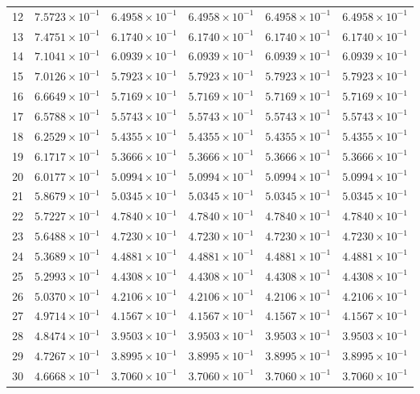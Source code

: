 \begin{table}[H]
\begin{tabular}{@{}rrrrrr@{}}
12 & $7.5723\times10^{-1}$ & $6.4958\times10^{-1}$ & $6.4958\times10^{-1}$ & $6.4958\times10^{-1}$ & $6.4958\times10^{-1}$\\
13 & $7.4751\times10^{-1}$ & $6.1740\times10^{-1}$ & $6.1740\times10^{-1}$ & $6.1740\times10^{-1}$ & $6.1740\times10^{-1}$\\
14 & $7.1041\times10^{-1}$ & $6.0939\times10^{-1}$ & $6.0939\times10^{-1}$ & $6.0939\times10^{-1}$ & $6.0939\times10^{-1}$\\
15 & $7.0126\times10^{-1}$ & $5.7923\times10^{-1}$ & $5.7923\times10^{-1}$ & $5.7923\times10^{-1}$ & $5.7923\times10^{-1}$\\
16 & $6.6649\times10^{-1}$ & $5.7169\times10^{-1}$ & $5.7169\times10^{-1}$ & $5.7169\times10^{-1}$ & $5.7169\times10^{-1}$\\
17 & $6.5788\times10^{-1}$ & $5.5743\times10^{-1}$ & $5.5743\times10^{-1}$ & $5.5743\times10^{-1}$ & $5.5743\times10^{-1}$\\
18 & $6.2529\times10^{-1}$ & $5.4355\times10^{-1}$ & $5.4355\times10^{-1}$ & $5.4355\times10^{-1}$ & $5.4355\times10^{-1}$\\
19 & $6.1717\times10^{-1}$ & $5.3666\times10^{-1}$ & $5.3666\times10^{-1}$ & $5.3666\times10^{-1}$ & $5.3666\times10^{-1}$\\
20 & $6.0177\times10^{-1}$ & $5.0994\times10^{-1}$ & $5.0994\times10^{-1}$ & $5.0994\times10^{-1}$ & $5.0994\times10^{-1}$\\
21 & $5.8679\times10^{-1}$ & $5.0345\times10^{-1}$ & $5.0345\times10^{-1}$ & $5.0345\times10^{-1}$ & $5.0345\times10^{-1}$\\
22 & $5.7227\times10^{-1}$ & $4.7840\times10^{-1}$ & $4.7840\times10^{-1}$ & $4.7840\times10^{-1}$ & $4.7840\times10^{-1}$\\
23 & $5.6488\times10^{-1}$ & $4.7230\times10^{-1}$ & $4.7230\times10^{-1}$ & $4.7230\times10^{-1}$ & $4.7230\times10^{-1}$\\
24 & $5.3689\times10^{-1}$ & $4.4881\times10^{-1}$ & $4.4881\times10^{-1}$ & $4.4881\times10^{-1}$ & $4.4881\times10^{-1}$\\
25 & $5.2993\times10^{-1}$ & $4.4308\times10^{-1}$ & $4.4308\times10^{-1}$ & $4.4308\times10^{-1}$ & $4.4308\times10^{-1}$\\
26 & $5.0370\times10^{-1}$ & $4.2106\times10^{-1}$ & $4.2106\times10^{-1}$ & $4.2106\times10^{-1}$ & $4.2106\times10^{-1}$\\
27 & $4.9714\times10^{-1}$ & $4.1567\times10^{-1}$ & $4.1567\times10^{-1}$ & $4.1567\times10^{-1}$ & $4.1567\times10^{-1}$\\
28 & $4.8474\times10^{-1}$ & $3.9503\times10^{-1}$ & $3.9503\times10^{-1}$ & $3.9503\times10^{-1}$ & $3.9503\times10^{-1}$\\
29 & $4.7267\times10^{-1}$ & $3.8995\times10^{-1}$ & $3.8995\times10^{-1}$ & $3.8995\times10^{-1}$ & $3.8995\times10^{-1}$\\
30 & $4.6668\times10^{-1}$ & $3.7060\times10^{-1}$ & $3.7060\times10^{-1}$ & $3.7060\times10^{-1}$ & $3.7060\times10^{-1}$\\
\bottomrule
\end{tabular}
\end{table}

